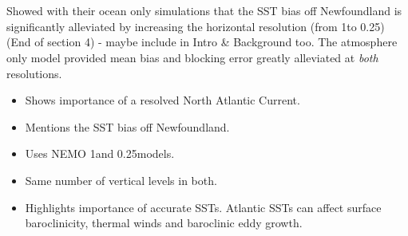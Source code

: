 \documentclass[..\Papers.tex]{subfiles}
\begin{document}
\section{\citep{Scaife2011a}}
Showed with their ocean only simulations that the SST bias off Newfoundland is significantly alleviated by increasing the horizontal resolution (from 1\degree to 0.25\degree) (End of section 4) - maybe include in Intro \& Background too. The atmosphere only model provided mean bias and blocking error greatly alleviated at \textit{both} resolutions.


\begin{itemize}
    \item Shows importance of a resolved North Atlantic Current.
    \item Mentions the SST bias off Newfoundland.
    \item Uses NEMO 1\degree and 0.25\degree models.
    \item Same number of vertical levels in both.
    \item Highlights importance of accurate SSTs. Atlantic SSTs can affect surface baroclinicity, thermal winds and baroclinic eddy growth.
\end{itemize}
\end{document}
